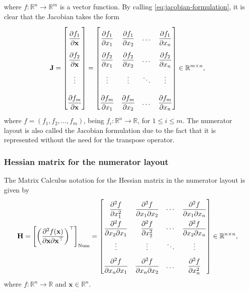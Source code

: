 \documentclass{article}
\begin{document}
where \(f: \mathbb{R}^{n} \rightarrow \mathbb{R}^{m}\) is a vector function. By calling \eqref{eq:jacobian-formulation}, it is clear that the Jacobian takes the form
\begin{align}
    \label{eq:jacobian-matrix}
    \mathbf{J} = \renewcommand{\arraystretch}{2.6} \begin{bmatrix}
        \dfrac{\partial f_1}{\partial \mathbf{x}} \\
        \dfrac{\partial f_2}{\partial \mathbf{x}} \\ 
        \vdots \\ 
        \dfrac{\partial f_m}{\partial \mathbf{x}}
    \end{bmatrix} = \begin{bmatrix}
        \dfrac{\partial f_1}{\partial x_1} & \dfrac{\partial f_1}{\partial x_2} & \dots & \dfrac{\partial f_1}{\partial x_n} \\
        \dfrac{\partial f_2}{\partial x_1} & \dfrac{\partial f_2}{\partial x_2} & \dots & \dfrac{\partial f_2}{\partial x_n} \\
        \vdots & \vdots & \ddots & \vdots \\
        \dfrac{\partial f_m}{\partial x_1} & \dfrac{\partial f_m}{\partial x_2} & \dots & \dfrac{\partial f_m}{\partial x_n} \\
    \end{bmatrix} \in \mathbb{R}^{m \times n},
\end{align}
where \(f = (f_1, f_2, \dots, f_m)\), being \(f_i: \mathbb{R}^n \rightarrow \mathbb{R}\), for \(1 \leq i \leq m\). The numerator layout is also called the Jacobian formulation due to the fact that it is represented without the need for the transpose operator.

\subsubsection{Hessian matrix for the numerator layout}

The Matrix Calculus notation for the Hessian matrix in the numerator layout is given by
\begin{align}
    \label{eq:hessian-eq-numerator}
    \mathbf{H} = \left[ \left( \dfrac{\partial^{2} f(\mathbf{x})}{\partial \mathbf{x} \partial \mathbf{x}^\top} \right)^\top \right]_{\textnormal{Num}} = \renewcommand{\arraystretch}{2.2}\begin{bmatrix}
        \dfrac{\partial^{2} f}{\partial x_1^2} & \dfrac{\partial^{2} f}{\partial x_1 \partial x_2} & \cdots & \dfrac{\partial^{2} f}{\partial x_1 \partial x_n} \\
        \dfrac{\partial^{2} f}{\partial x_2 \partial x_1} & \dfrac{\partial^{2} f}{\partial x_2^2} & \cdots & \dfrac{\partial^{2} f}{\partial x_2 \partial x_n} \\
        \vdots & \vdots & \ddots & \vdots \\
        \dfrac{\partial^{2} f}{\partial x_n \partial x_1} & \dfrac{\partial^{2} f}{\partial x_n \partial x_2} & \dots & \dfrac{\partial^{2} f}{\partial x_n^2}
    \end{bmatrix} \in \mathbb{R}^{n \times n},
\end{align}
where \(f: \mathbb{R}^{n} \rightarrow \mathbb{R}\) and \(\mathbf{x} \in \mathbb{R}^{n}\).
\end{document}
